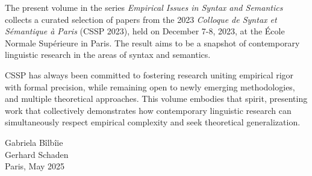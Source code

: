 \begin{refsection}
The present volume in the series \emph{Empirical Issues in Syntax and Semantics} collects a curated selection of papers from the 2023 \emph{Colloque de Syntax et Sémantique à Paris} (CSSP 2023), held on December 7-8, 2023, at the École Normale Supérieure in Paris. The result aims to be a snapshot of contemporary linguistic research in the areas of syntax and semantics.

CSSP has always been committed to fostering research uniting empirical rigor with formal precision, while remaining open to newly emerging methodologies, and multiple theoretical approaches. This volume embodies that spirit, presenting work that collectively demonstrates how contemporary linguistic research can simultaneously respect empirical complexity and seek theoretical generalization. 


\vspace{5mm}

\noindent{}Gabriela Bîlbîie\\
Gerhard Schaden\\
Paris, May 2025


\end{refsection}

